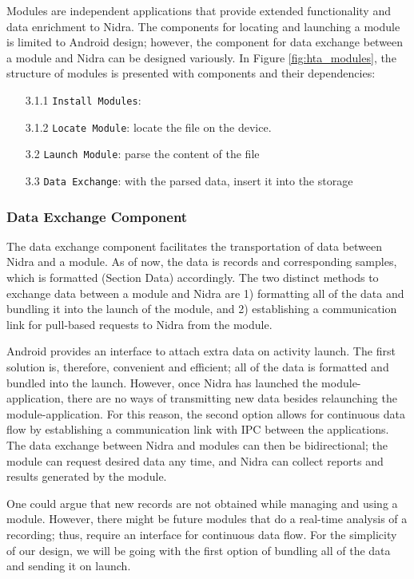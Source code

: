 Modules are independent applications that provide extended functionality and data enrichment to Nidra. The components for locating and launching a module is limited to Android design; however, the component for data exchange between a module and Nidra can be designed variously.  In Figure \ref{fig:hta_modules}, the structure of modules is presented with components and their dependencies:   

\begin{itemize}
    \item[3.1.1] \verb|Install Modules|:
    \item[3.1.2] \verb|Locate Module|: locate the file on the device.
    \item[3.2] \verb|Launch Module|: parse the content of the file 
    \item[3.3] \verb|Data Exchange|: with the parsed data, insert it into the storage 
\end{itemize}

\subsubsection{Data Exchange Component}

The data exchange component facilitates the transportation of data between Nidra and a module. As of now, the data is records and corresponding samples, which is formatted (Section Data) accordingly. The two distinct methods to exchange data between a module and Nidra are 1) formatting all of the data and bundling it into the launch of the module, and 2) establishing a communication link for pull-based requests to Nidra from the module. 

Android provides an interface to attach extra data on activity launch. The first solution is, therefore, convenient and efficient; all of the data is formatted and bundled into the launch. However, once Nidra has launched the module-application, there are no ways of transmitting new data besides relaunching the module-application. For this reason, the second option allows for continuous data flow by establishing a communication link with IPC between the applications. The data exchange between Nidra and modules can then be bidirectional; the module can request desired data any time, and Nidra can collect reports and results generated by the module. 

One could argue that new records are not obtained while managing and using a module. However, there might be future modules that do a real-time analysis of a recording; thus, require an interface for continuous data flow. For the simplicity of our design, we will be going with the first option of bundling all of the data and sending it on launch.


